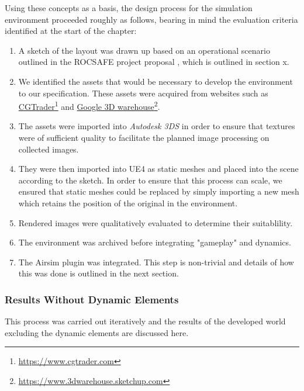 Using these concepts as a basis, the design process for the simulation environment proceeded roughly as follows, bearing in mind the evaluation criteria identified at the start of the chapter:
\begin{enumerate}
    \item A sketch of the layout was drawn up based on an operational scenario outlined in the ROCSAFE project proposal \cite{rocsafeNUIG}, which is outlined in section x.
    \item We identified the assets that would be necessary to develop the environment to our specification. These assets were acquired from websites such as 
\href{http://www.cgtrader.com}{CGTrader}\footnote{\href {http://www.cgtrader.com}{https://www.cgtrader.com}}
and 
\href{https://3dwarehouse.sketchup.com/?hl=en}{Google 3D warehouse}\footnote{\href {https://3dwarehouse.sketchup.com/?hl=en}{https://www.3dwarehouse.sketchup.com}}.
\item The assets were imported into \emph{Autodesk 3DS} in order to ensure that textures were of sufficient quality to facilitate the planned image processing on collected images.
\item They were then imported into UE4 as static meshes and placed into the scene according to the sketch. In order to ensure that this process can scale, we ensured that static meshes could be replaced by simply importing a new mesh which retains the position of the original in the environment. 
\item Rendered images were qualitatively evaluated to determine their suitablility.
\item The environment was archived before integrating "gameplay" and dynamics.
\item The Airsim \cite{ShahAirSim:Vehicles} plugin was integrated. This step is non-trivial and details of how this was done is outlined in the next section.
\end{enumerate} 
\subsubsection{Results Without Dynamic Elements}
This process was carried out iteratively and the results of the developed world excluding the dynamic elements are discussed here. 

